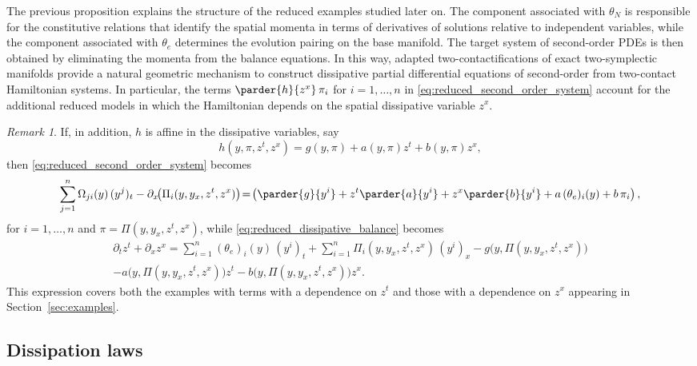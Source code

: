 \documentclass[11pt,a4paper]{article}
\theoremstyle{plain} \newtheorem{theorem}{Theorem}[section] \newtheorem{proposition}[theorem]{Proposition} \newtheorem{corollary}[theorem]{Corollary} \newtheorem{lemma}[theorem]{Lemma} \theoremstyle{definition} \newtheorem{definition}[theorem]{Definition} \theoremstyle{remark} \newtheorem{remark}[theorem]{Remark} \newtheorem{example}[theorem]{Example} %
\begin{document}
The previous proposition explains the structure of the reduced examples studied later on. The component associated with \(\theta_{N}\) is responsible for the constitutive relations that identify the spatial momenta in terms of derivatives of solutions relative to independent variables, while the component associated with \(\theta_e\) determines the evolution pairing on the base manifold. The target system of second-order PDEs is then obtained by eliminating the momenta from the balance equations. In this way, adapted two-contactifications of exact two-symplectic manifolds provide a natural geometric mechanism to construct dissipative partial differential equations of second-order from two-contact Hamiltonian systems. In particular, the terms \(\parder{h}{z^x}\,\pi_i\) for $i=1,\ldots,n$ in \eqref{eq:reduced_second_order_system}  account for the additional reduced models in which the Hamiltonian depends on the spatial dissipative variable \(z^x\).

\begin{remark}\label{rem:affine_reduced_case}
If, in addition, \(h\) is affine in the dissipative variables, say
\[
h(y,\pi,z^t,z^x)=g(y,\pi)+a(y,\pi)z^t+b(y,\pi)z^x,
\]
then \eqref{eq:reduced_second_order_system} becomes
\begin{equation}\label{eq:reduced_second_order_system_affine}
\sum_{j=1}^n \Omega_{ji}(y)\,(y^j)_t-\partial_x\!\bigl(\Pi_i(y,y_x,z^t,z^x)\bigr)\!=\!\left(\parder{g}{y^i}+z^t\parder{a}{y^i}+z^x\parder{b}{y^i}+a\,(\theta_e)_i(y)+b\,\pi_i\right),
\end{equation}
for \(i=1,\dots,n\) and ${\pi=\Pi(y,y_x,z^t,z^x)}$, while \eqref{eq:reduced_dissipative_balance} becomes
\begin{multline*}
\partial_t z^t+\partial_x z^x=\sum_{i=1}^n (\theta_e)_i(y)\,(y^i)_t+\sum_{i=1}^n \Pi_i(y,y_x,z^t,z^x)\,(y^i)_x-g\bigl(y,\Pi(y,y_x,z^t,z^x)\bigr)\\-a\bigl(y,\Pi(y,y_x,z^t,z^x)\bigr)z^t-b\bigl(y,\Pi(y,y_x,z^t,z^x)\bigr)z^x.
\end{multline*}
 This expression covers both the examples with terms with a  dependence on \(z^t\) and those with a  dependence on \(z^x\) appearing in Section~\ref{sec:examples}.
\end{remark}
 
 
\subsection{Dissipation laws} \label{Sec:Dissipation}
\end{document}
